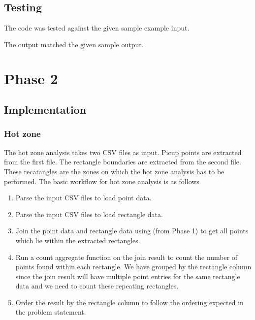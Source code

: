 \subsection{Testing}
The code was tested against the given sample example input.


The output matched the given sample output.


\newpage

\section{Phase 2} \label{Phase 2}

\subsection{Implementation}

\subsubsection{Hot zone}

The hot zone analysis takes two CSV files as input. Picup points are extracted from the first file. The rectangle boundaries are extracted from the second file. These recatangles are the zones on which the hot zone analysis has to be performed. The basic workflow for hot zone analysis is as follows
\begin{enumerate}
    \item Parse the input CSV files to load point data.
    \item Parse the input CSV files to load rectangle data.
    \item  Join the point data and rectangle data using  (from Phase 1) to get all points which lie within the extracted rectangles. 
    \item Run a count aggregate function on the join result to count the number of points found within each rectangle. We have grouped by the rectangle column since the join result will have multiple point entries for the same rectangle data and we need to count these repeating rectangles.
    \item Order the result by the rectangle column to follow the ordering expected in the problem statement.
\end{enumerate}

